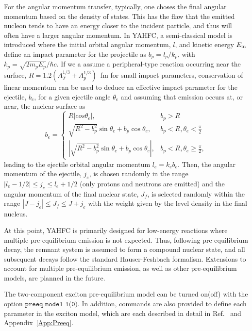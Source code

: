 \documentclass[
10pt,
showpacs,preprintnumbers,footinbib,
amsfonts,amsmath,amssymb,
aps,
prc,twocolumn,groupedaddress,superscriptaddress,
showkeys,
nofootinbib
]{revtex4-1}
\begin{document}
For the angular momentum transfer, typically, one choses the final angular momentum based on the density of states. This has the flaw that the emitted nucleon tends to have an energy closer to the incident particle, and thus will often have a larger angular momentum. In YAHFC, a semi-classical model is introduced where the initial orbital angular momentum, $l$, and kinetic energy $E_{\rm in}$ define an impact parameter for the projectile as $b_p = l_p/k_p$, with $k_p = \sqrt{2m_pE_p}/\hbar c$. If we a assume a peripheral-type reaction occurring near the surface, $R = 1.2 (A_T^{1/3} + A_p^{1/3})$~fm for small impact parameters, conservation of linear momentum can be used to deduce an effective impact parameter for the ejectile, $b_e$, for a given ejectile angle $\theta_e$ and assuming that emission occurs at, or near, the nuclear surface as 
\begin{equation}
b_e = 
\begin{cases}
R |cos\theta_e |,     &  b_p > R \\
 \sqrt{R^2-b_p^2}\sin\theta_e + b_p\cos\theta_e,       &   b_p < R, \theta_e < \frac{\pi}{2} \\
\left |\sqrt{R^2-b_p^2}\sin\theta_e + b_p\cos\theta_e \right |,      &    b_p < R, \theta_e \ge \frac{\pi}{2},
 \end{cases}
\end{equation} 
leading to the ejectile orbital angular momentum $l_e = k_eb_e$. Then, the angular momentum of the ejectile, $j_e$, is chosen randomly in the range $|l_e-1/2| \le j_e \le l_e+1/2$ (only protons and neutrons are emitted) and the angular momentum of the final nuclear state, $J_f$, is selected randomly within the range $|J-j_e| \le J_f \le J+j_e$ with the weight given by the level density in the final nucleus.

At this point, YAHFC is primarily designed for low-energy reactions where multiple pre-equilibrium emission is not expected. Thus, following pre-equilibrium decay, the remnant system is assumed to form a compound nuclear state, and all subsequent decays follow the standard Hauser-Feshbach formalism. Extensions to account for multiple pre-equilibrium emission, as well as other pre-equilibrium models, are planned in the future.

The two-component exciton pre-equilibrium model can be turned on(off) with the option ${\texttt {preeq\_model 1(0)}}$. In addition, commands are also provided to define each parameter in the exciton model, which are each described in detail in Ref.~\cite{Koning:2004} and Appendix~\ref{App:Preeq}.
\end{document}
